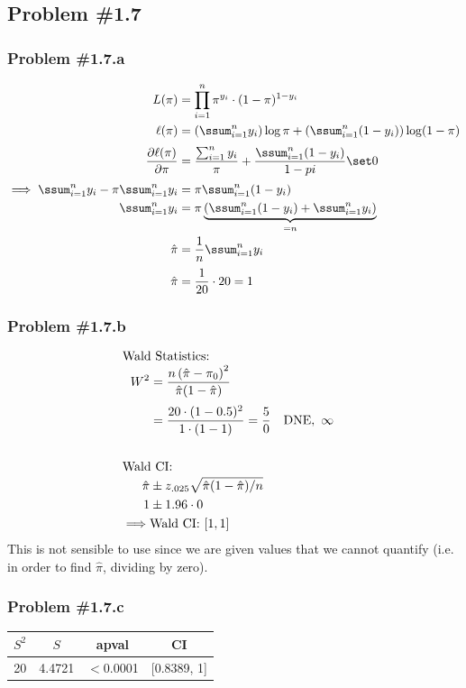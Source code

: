 \documentclass[12pt, letterpaper]{article}
\begin{document}
\subsection*{Problem {\#}1.7} 
\subsubsection*{Problem {\#}1.7.a}  
\begin{align*}
L(\pi) & = \prod_{i=1}^n \pi^{y_i} \cdot (1 - \pi)^{1 - y_i} 
\\
\ell(\pi) & = \left( \ssum_{i=1}^n y_i \right) \log \pi + \left( \ssum_{i=1}^n (1 - y_i) \right) \log (1 - \pi) 
\\[0.5ex]
\frac{ \partial \ell(\pi) }{\partial \pi} 
& = \frac{ \sum_{i=1}^n y_i }{\pi} + \frac{ \ssum_{i=1}^n (1 - y_i) }{1 - pi} \set 0 
\\[0.5ex]
\implies  \ssum_{i=1}^n y_i - \pi \ssum_{i=1}^n y_i & = \pi \ssum_{i=1}^n (1 - y_i) 
\\
\ssum_{i=1}^n y_i & = \pi \underbrace{ \left( \ssum_{i=1}^n (1 - y_i) + \ssum_{i=1}^n y_i \right)}_{ = n} 
\\
\hat{\pi} & = \frac{1}{n} \ssum_{i=1}^n y_i 
\\[0.5ex]
\hat{\pi} & = \frac{1}{20} \cdot 20  = 1 
\end{align*}

\subsubsection*{Problem {\#}1.7.b} 
\begin{align*}
\omit\rlap{Wald Statistics:} \\
W^2 & = \frac{ n \left( \hat{\pi} - \pi_0 \right)^2 }{ \hat{\pi} (1 - \hat{\pi})} 
\\[0.5ex]
& = \frac{ 20 \cdot ( 1 - 0.5)^2}{1 \cdot (1 - 1) } = \frac{5}{0} \quad \text{DNE}, \ \infty 
\\ \quad \\
\omit\rlap{Wald CI:} \\
\hat{\pi} & \pm z_{.025} \sqrt{ \hat{\pi}(1 - \hat{\pi}) / n } \\
1 & \pm 1.96 \cdot 0 \\
\implies & \text{Wald CI: } [1, 1] 
\end{align*}
This is not sensible to use since we are given values that we cannot quantify (i.e. in order to find $\hat{\pi}$, dividing by zero).  


\subsubsection*{Problem {\#}1.7.c}
\begin{tabular}{c c c c}
$S^2$ & $S$ & apval & CI \\ \hline 
20 & 4.4721 & $<$0.0001 & [0.8389, 1]
\end{tabular}
 
\end{document}
